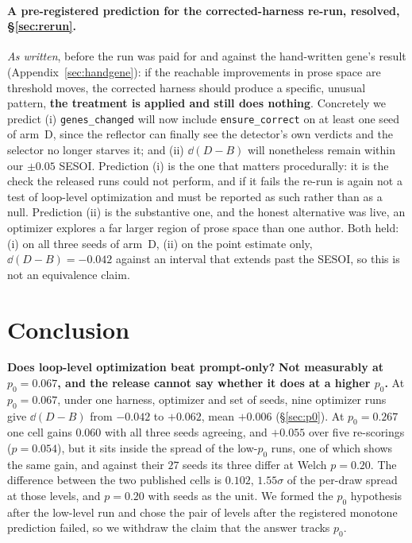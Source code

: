 \documentclass[11pt]{article}
\begin{document}
\paragraph{A pre-registered prediction for the corrected-harness re-run, \textbf{resolved,
\S\ref{sec:rerun}}.} \emph{As written}, before the run was paid for and against the hand-written
gene's result (Appendix~\ref{sec:handgene}): if the reachable improvements in prose space are
threshold moves, the corrected harness should produce a specific, unusual pattern, \textbf{the
treatment is applied and still does nothing}. Concretely we predict (i) \texttt{genes\_changed}
will now include \texttt{ensure\_correct} on at least one seed of arm~D, since the reflector can
finally see the detector's own verdicts and the selector no longer starves it; and (ii)
$\dd(D-B)$ will nonetheless remain within our $\pm0.05$ SESOI. Prediction (i) is the one that
matters procedurally: it is the check the released runs could not perform, and if it fails the
re-run is again not a test of loop-level optimization and must be reported as such rather than as
a null. Prediction (ii) is the substantive one, and the honest alternative was live, an
optimizer explores a far larger region of prose space than one author. Both held: (i) on all three
seeds of arm~D, (ii) on the point estimate only, $\dd(D-B) = -0.042$ against an interval that
extends past the SESOI, so this is not an equivalence claim.

\section{Conclusion}
\label{sec:conclusion}

\textbf{Does loop-level optimization beat prompt-only?} \textbf{Not measurably at
$p_0 = 0.067$, and the release cannot say whether it does at a higher $p_0$.} At $p_0 = 0.067$,
under one harness, optimizer and set of seeds, nine optimizer runs give $\dd(D-B)$ from $-0.042$
to $+0.062$, mean $+0.006$ (\S\ref{sec:p0}). At $p_0 = 0.267$ one cell gains $0.060$ with all
three seeds agreeing, and $+0.055$ over five re-scorings ($p = 0.054$), but it sits inside the
spread of the low-$p_0$ runs, one of which shows the same gain, and against their $27$ seeds its
three differ at Welch $p = 0.20$. The difference between the two published cells is $0.102$,
$1.55\sigma$ of the per-draw spread at those levels, and $p = 0.20$ with seeds as the unit. We
formed the $p_0$ hypothesis after the low-level run and chose the pair of levels after the
registered monotone prediction failed, so we withdraw the claim that the answer tracks $p_0$.
\end{document}
